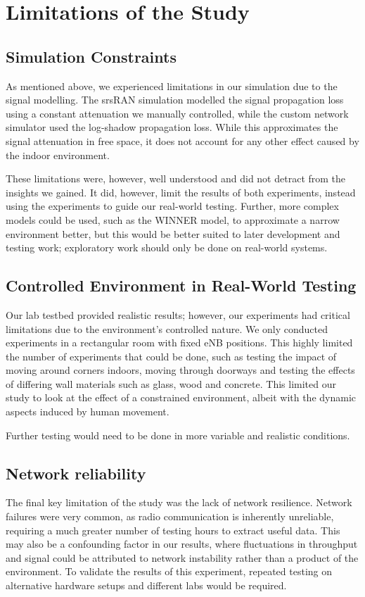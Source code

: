 \section{Limitations of the Study}
\subsection{Simulation Constraints}
As mentioned above, we experienced limitations in our simulation due to the signal modelling. The srsRAN simulation modelled the signal propagation loss using a constant attenuation we manually controlled, while the custom network simulator used the log-shadow propagation loss. While this approximates the signal attenuation in free space, it does not account for any other effect caused by the indoor environment.

These limitations were, however, well understood and did not detract from the insights we gained. It did, however, limit the results of both experiments, instead using the experiments to guide our real-world testing. Further, more complex models could be used, such as the WINNER \insertref model, to approximate a narrow environment better, but this would be better suited to later development and testing work; exploratory work should only be done on real-world systems.

\subsection{Controlled Environment in Real-World Testing}
Our lab testbed provided realistic results; however, our experiments had critical limitations due to the environment's controlled nature. We only conducted experiments in a rectangular room with fixed eNB positions. This highly limited the number of experiments that could be done, such as testing the impact of moving around corners indoors, moving through doorways and testing the effects of differing wall materials such as glass, wood and concrete. This limited our study to look at the effect of a constrained environment, albeit with the dynamic aspects induced by human movement.

Further testing would need to be done in more variable and realistic conditions.

\subsection{Network reliability}
The final key limitation of the study was the lack of network resilience. Network failures were very common, as radio communication is inherently unreliable, requiring a much greater number of testing hours to extract useful data. This may also be a confounding factor in our results, where fluctuations in throughput and signal could be attributed to network instability rather than a product of the environment. To validate the results of this experiment, repeated testing on alternative hardware setups and different labs would be required.

